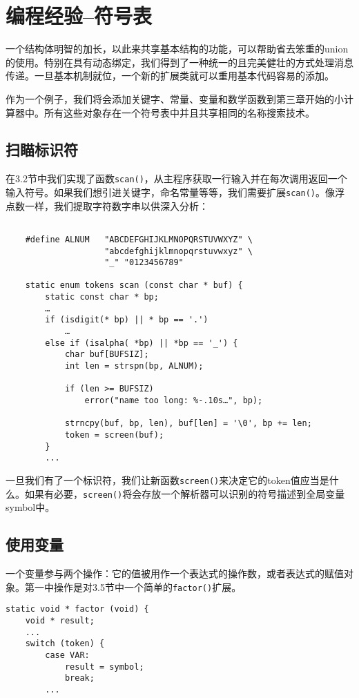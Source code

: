 \chapter{编程经验--符号表}

一个结构体明智的加长，以此来共享基本结构的功能，可以帮助省去笨重的union的使用。特别在具有动态绑定，我们得到了一种统一的且完美健壮的方式处理消息传递。一旦基本机制就位，一个新的扩展类就可以重用基本代码容易的添加。

作为一个例子，我们将会添加关键字、常量、变量和数学函数到第三章开始的小计算器中。所有这些对象存在一个符号表中并且共享相同的名称搜索技术。

\section{扫瞄标识符}

在3.2节中我们实现了函数\verb|scan()|，从主程序获取一行输入并在每次调用返回一个输入符号。如果我们想引进关键字，命名常量等等，我们需要扩展\verb|scan()|。像浮点数一样，我们提取字符数字串以供深入分析：

\begin{lstlisting}

	#define ALNUM	"ABCDEFGHIJKLMNOPQRSTUVWXYZ" \
					"abcdefghijklmnopqrstuvwxyz" \
					"_" "0123456789"
	
	static enum tokens scan (const char * buf) {
		static const char * bp;
		…
		if (isdigit(* bp) || * bp == '.')
			…
		else if (isalpha( *bp) || *bp == '_') {
			char buf[BUFSIZ];
			int len = strspn(bp, ALNUM);
			
			if (len >= BUFSIZ)
				error("name too long: %-.10s…", bp);
			
			strncpy(buf, bp, len), buf[len] = '\0', bp += len;
			token = screen(buf);
		}
		...

\end{lstlisting}

一旦我们有了一个标识符，我们让新函数\verb|screen()|来决定它的token值应当是什么。如果有必要，\verb|screen()|将会存放一个解析器可以识别的符号描述到全局变量symbol中。

\section{使用变量}

一个变量参与两个操作：它的值被用作一个表达式的操作数，或者表达式的赋值对象。第一中操作是对3.5节中一个简单的\verb|factor()|扩展。

\begin{lstlisting}
static void * factor (void) {
	void * result;
	...
	switch (token) {
		case VAR:
			result = symbol;
			break;
		...
\end{lstlisting}

